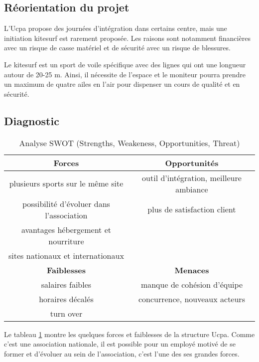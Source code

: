 \documentclass[11pt,a4paper]{report}
\begin{document}
\subsection{Réorientation du projet\label{reorientation}}

L'Ucpa propose des journées d'intégration dans certains centre, mais
une initiation kitesurf est rarement proposée. Les raisons sont notamment
financières avec un risque de casse matériel et de sécurité avec un risque
de blessures.

Le kitesurf est un sport de voile spécifique avec des lignes  qui ont
une longueur autour de  20-25 m. Ainsi, il nécessite de l'espace
et le moniteur pourra prendre un maximum de quatre ailes en l'air
pour dispenser un cours de qualité et en sécurité. 

\subsection{Diagnostic}
\begin{table}[h]
\centering
\begin{tabular}{|c|c|}
        \hline
        \textbf{Forces}                          & \textbf{Opportunités} \\ 
        \hline
        plusieurs sports sur le m\^eme site      &  outil d'intégration, meilleure ambiance\\
        possibilité d'évoluer dans l'association & plus de satisfaction client  \\
        avantages hébergement et nourriture      &                              \\
        sites nationaux et internationaux        &                             \\
        \hline
        \textbf{Faiblesses}                      &  \textbf{Menaces} \\ 
        \hline
        salaires faibles                         & manque de cohésion d'équipe \\
        horaires décalés                         & concurrence, nouveaux acteurs   \\
        turn over                                &                               \\
        \hline
\end{tabular}
\caption{Analyse SWOT (Strengths, Weakeness, Opportunities, Threat)\label{swot}}
\end{table}
Le tableau \ref{swot} montre les quelques forces et faiblesses de la 
structure Ucpa. Comme c'est une association nationale, il est 
possible pour un  employé motivé de se former et d'évoluer
au sein de l'association, c'est l'une des ses grandes forces.
 
\end{document}
